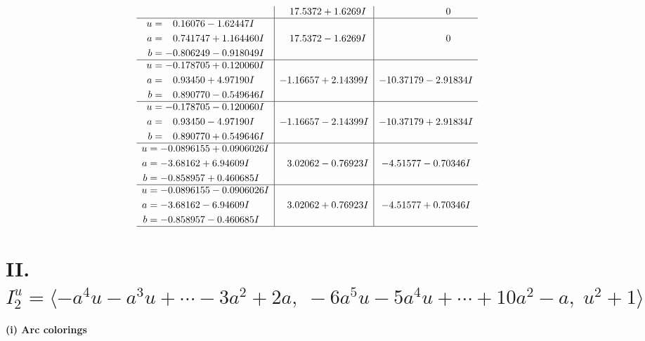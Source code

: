 \documentclass[1p]{elsarticle_modified}
\theoremstyle{definition}
\begin{document}
$$\begin{array}{c|c|c}
 & \phantom{-}17.5372 + 1.6269 I & \phantom{-0.000000 } 0 \\ \hline\begin{aligned}
u &= \phantom{-}0.16076 - 1.62447 I \\
a &= \phantom{-}0.741747 + 1.164460 I \\
b &= -0.806249 - 0.918049 I\end{aligned}
 & \phantom{-}17.5372 - 1.6269 I & \phantom{-0.000000 } 0 \\ \hline\begin{aligned}
u &= -0.178705 + 0.120060 I \\
a &= \phantom{-}0.93450 + 4.97190 I \\
b &= \phantom{-}0.890770 - 0.549646 I\end{aligned}
 & -1.16657 + 2.14399 I & -10.37179 - 2.91834 I \\ \hline\begin{aligned}
u &= -0.178705 - 0.120060 I \\
a &= \phantom{-}0.93450 - 4.97190 I \\
b &= \phantom{-}0.890770 + 0.549646 I\end{aligned}
 & -1.16657 - 2.14399 I & -10.37179 + 2.91834 I \\ \hline\begin{aligned}
u &= -0.0896155 + 0.0906026 I \\
a &= -3.68162 + 6.94609 I \\
b &= -0.858957 + 0.460685 I\end{aligned}
 & \phantom{-}3.02062 - 0.76923 I & -4.51577 - 0.70346 I \\ \hline\begin{aligned}
u &= -0.0896155 - 0.0906026 I \\
a &= -3.68162 - 6.94609 I \\
b &= -0.858957 - 0.460685 I\end{aligned}
 & \phantom{-}3.02062 + 0.76923 I & -4.51577 + 0.70346 I\\
 \hline 
 \end{array}$$\newpage\newpage\renewcommand{\arraystretch}{1}
\centering \section*{II. $I^u_{2}= \langle - a^4 u- a^3 u+\cdots-3 a^2+2 a,\;-6 a^5 u-5 a^4 u+\cdots+10 a^2- a,\;u^2+1 \rangle$}
\flushleft \textbf{(i) Arc colorings}\\
\end{document}
